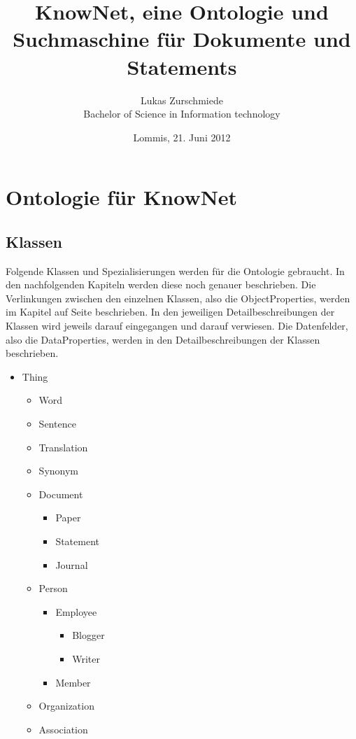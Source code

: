 \documentclass[
    11pt,
    latin1,
    a4paper,
    oneside
]{scrreprt}
\author{Lukas Zurschmiede\\Bachelor of Science in Information technology}
\date{Lommis, 21. Juni 2012}
\title{KnowNet, eine Ontologie und Suchmaschine f\"ur Dokumente und Statements}
\begin{document}
\maketitle

\newpage
\singlespacing
\tableofcontents

\pagebreak
\onehalfspacing
\setcounter{page}{1}

\chapter{Ontologie f\"ur KnowNet} \label{ontology}


\section{Klassen} \label{sec:class}

Folgende Klassen und Spezialisierungen werden f\"ur die Ontologie gebraucht. In den nachfolgenden Kapiteln werden diese noch genauer beschrieben. Die Verlinkungen zwischen den einzelnen Klassen, also die ObjectProperties, werden im Kapitel  auf Seite \pageref{sec:relations} beschrieben. In den jeweiligen Detailbeschreibungen der Klassen wird jeweils darauf eingegangen und darauf verwiesen. Die Datenfelder, also die DataProperties, werden in den Detailbeschreibungen der Klassen beschrieben.

\begin{itemize}
	\item Thing
		\begin{itemize}
			\item Word
			\item Sentence
			\item Translation
			\item Synonym
			\item Document
			\begin{itemize}
				\item Paper
				\item Statement
				\item Journal
			\end{itemize}
			\item Person
			\begin{itemize}
				\item Employee
				\begin{itemize}
					\item Blogger
					\item Writer
				\end{itemize}
				\item Member
			\end{itemize}
		\item Organization
		\item Association
	\end{itemize}
\end{itemize}
\end{document}
